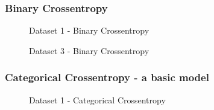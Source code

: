 \subsubsection*{Binary Crossentropy}
\begin{figure}[h]
	\centering
    \def\svgwidth{\textwidth}
    \caption{Dataset 1 - Binary Crossentropy}
    \label{fig:ds1binarycrossentropy}
\end{figure}

\begin{figure}[h]
	\centering
    \def\svgwidth{\textwidth}
    \caption{Dataset 3 - Binary Crossentropy}
    \label{fig:ds3binarycrossentropy}
\end{figure}
\subsubsection*{Categorical Crossentropy - a basic model}
\begin{figure}[h]
	\centering
    \def\svgwidth{\textwidth}
    \caption{Dataset 1 - Categorical Crossentropy}
    \label{fig:ds1categoricalcrossentropy}
\end{figure}

